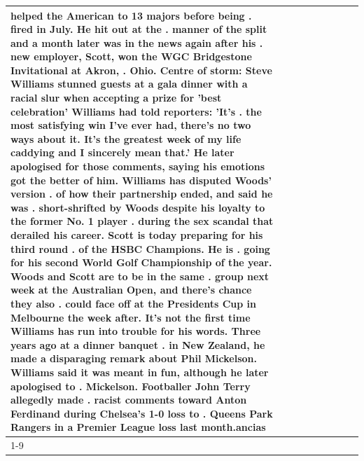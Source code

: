 \begin{table}[H]
\begin{tabular}{lllrlllll}
helped the American to 13 majors before being . fired in July. He hit out at the . manner of the split and a month later was in the news again after his . new employer, Scott, won the WGC Bridgestone Invitational at Akron, . Ohio. Centre of storm: Steve Williams stunned guests at a gala dinner with a racial slur when accepting a prize for 'best celebration' Williams had told reporters: 'It's . the most satisfying win I've ever had, there's no two ways about it. It's the greatest week of my life caddying and I sincerely mean that.' He later apologised for those comments, saying his emotions got the better of him. Williams has disputed Woods' version . of how their partnership ended, and said he was . short-shrifted by Woods despite his loyalty to the former No. 1 player . during the sex scandal that derailed his career. Scott is today preparing for his third round . of the HSBC Champions. He is . going for his second World Golf Championship of the year. Woods and Scott are to be in the same . group next week at the Australian Open, and there's chance they also . could face off at the Presidents Cup in Melbourne the week after. It's not the first time Williams has run into trouble for his words. Three years ago at a dinner banquet . in New Zealand, he made a disparaging remark about Phil Mickelson. Williams said it was meant in fun, although he later apologised to . Mickelson. Footballer John Terry allegedly made . racist comments toward Anton Ferdinand during Chelsea's 1-0 loss to . Queens Park Rangers in a Premier League loss last month.ancias \\
\cline{1-9}

\end{tabular}
\end{table}
